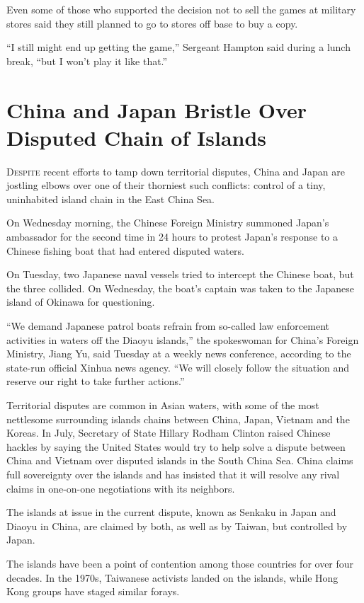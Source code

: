 ﻿\documentclass[12pt]{article}
\begin{document}
Even some of those who supported the decision not to sell the games at military stores said they
still planned to go to stores off base to buy a copy.

``I still might end up getting the game,'' Sergeant Hampton said during a lunch break, ``but I won't
play it like that.''

\pagebreak
\section{China and Japan Bristle Over Disputed Chain of Islands}

\lettrine{D}{espite} recent efforts to tamp down territorial disputes,
China and Japan are jostling elbows over one of their thorniest such conflicts: control of a tiny,
uninhabited island chain in the East China Sea.

On Wednesday morning, the Chinese Foreign Ministry summoned Japan's ambassador for the second time
in 24 hours to protest Japan's response to a Chinese fishing boat that had entered disputed waters.

On Tuesday, two Japanese naval vessels tried to intercept the Chinese boat, but the three collided.
On Wednesday, the boat's captain was taken to the Japanese island of Okinawa for questioning.

``We demand Japanese patrol boats refrain from so-called law enforcement activities in waters off
the Diaoyu islands,'' the spokeswoman for China's Foreign Ministry, Jiang Yu, said Tuesday at a
weekly news conference, according to the state-run official Xinhua news agency. ``We will closely
follow the situation and reserve our right to take further actions.''

Territorial disputes are common in Asian waters, with some of the most nettlesome surrounding
islands chains between China, Japan, Vietnam and the Koreas. In July, Secretary of State Hillary
Rodham Clinton raised Chinese hackles by saying the United States would try to help solve a dispute
between China and Vietnam over disputed islands in the South China Sea. China claims full
sovereignty over the islands and has insisted that it will resolve any rival claims in one-on-one
negotiations with its neighbors.

The islands at issue in the current dispute, known as Senkaku in Japan and Diaoyu in China, are
claimed by both, as well as by Taiwan, but controlled by Japan.

The islands have been a point of contention among those countries for over four decades. In the
1970s, Taiwanese activists landed on the islands, while Hong Kong groups have staged similar forays.
\end{document}

